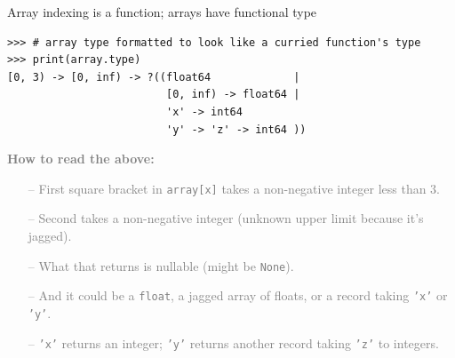 \documentclass[aspectratio=169]{beamer}
\begin{document}
\begin{frame}[fragile]{Array indexing is a function; arrays have functional type}
\small
\begin{verbatim}
>>> # array type formatted to look like a curried function's type
>>> print(array.type)
[0, 3) -> [0, inf) -> ?((float64             |
                         [0, inf) -> float64 |
                         'x' -> int64
                         'y' -> 'z' -> int64 ))
\end{verbatim}

\normalsize
\vspace{0.5 cm}
\textcolor{gray}{\bf How to read the above:}
\begin{itemize}
\item[\textcolor{gray}{--}] \textcolor{gray}{First square bracket in \texttt{array[x]} takes a non-negative integer less than 3.}
\item[\textcolor{gray}{--}] \textcolor{gray}{Second takes a non-negative integer (unknown upper limit because it's jagged).}
\item[\textcolor{gray}{--}] \textcolor{gray}{What that returns is nullable (might be \texttt{None}).}
\item[\textcolor{gray}{--}] \textcolor{gray}{And it could be a \texttt{float}, a jagged array of floats, or a record taking \texttt{'x'} or \texttt{'y'}.}
\item[\textcolor{gray}{--}] \textcolor{gray}{\texttt{'x'} returns an integer; \texttt{'y'} returns another record taking \texttt{'z'} to integers.}
\end{itemize}
\end{frame}
\end{document}
